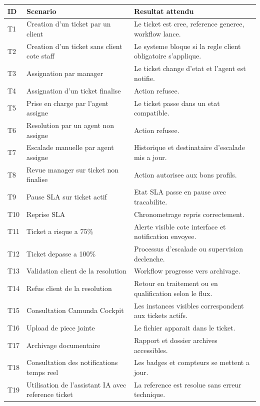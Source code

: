\begin{longtable}{>{\raggedright\arraybackslash}p{1.2cm} >{\raggedright\arraybackslash}p{4.2cm} >{\raggedright\arraybackslash}p{7.6cm}}
\toprule
ID & Scenario & Resultat attendu \\
\midrule
T1 & Creation d'un ticket par un client & Le ticket est cree, reference generee, workflow lance. \\
T2 & Creation d'un ticket sans client cote staff & Le systeme bloque si la regle client obligatoire s'applique. \\
T3 & Assignation par manager & Le ticket change d'etat et l'agent est notifie. \\
T4 & Assignation d'un ticket finalise & Action refusee. \\
T5 & Prise en charge par l'agent assigne & Le ticket passe dans un etat compatible. \\
T6 & Resolution par un agent non assigne & Action refusee. \\
T7 & Escalade manuelle par agent assigne & Historique et destinataire d'escalade mis a jour. \\
T8 & Revue manager sur ticket non finalise & Action autorisee aux bons profils. \\
T9 & Pause SLA sur ticket actif & Etat SLA passe en pause avec tracabilite. \\
T10 & Reprise SLA & Chronometrage repris correctement. \\
T11 & Ticket a risque a 75\% & Alerte visible cote interface et notification envoyee. \\
T12 & Ticket depasse a 100\% & Processus d'escalade ou supervision declenche. \\
T13 & Validation client de la resolution & Workflow progresse vers archivage. \\
T14 & Refus client de la resolution & Retour en traitement ou en qualification selon le flux. \\
T15 & Consultation Camunda Cockpit & Les instances visibles correspondent aux tickets actifs. \\
T16 & Upload de piece jointe & Le fichier apparait dans le ticket. \\
T17 & Archivage documentaire & Rapport et dossier archives accessibles. \\
T18 & Consultation des notifications temps reel & Les badges et compteurs se mettent a jour. \\
T19 & Utilisation de l'assistant IA avec reference ticket & La reference est resolue sans erreur technique. \\

\end{longtable}
